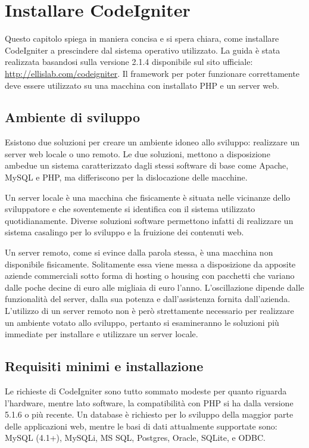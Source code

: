 \chapter{Installare CodeIgniter}
\label{cap:installazione}

Questo capitolo spiega in maniera concisa e si spera chiara, come installare CodeIgniter a prescindere dal sistema operativo utilizzato. La guida è stata realizzata basandosi sulla versione 2.1.4 disponibile sul sito ufficiale: \url{http://ellislab.com/codeigniter}. Il framework per poter funzionare correttamente deve essere utilizzato su una macchina con installato \ac{PHP} e un server web.

\section{Ambiente di sviluppo}
Esistono due soluzioni per creare un ambiente idoneo allo sviluppo: realizzare un server web locale o uno remoto. Le due soluzioni, mettono a disposizione ambedue un sistema caratterizzato dagli stessi software di base come Apache, MySQL e PHP, ma differiscono per la dislocazione delle macchine.

Un server locale è una macchina che fisicamente è situata nelle vicinanze dello sviluppatore e che soventemente si identifica con il sistema utilizzato quotidianamente. Diverse soluzioni software permettono infatti di realizzare un sistema casalingo per lo sviluppo e la fruizione dei contenuti web.

Un server remoto, come si evince dalla parola stessa, è una macchina non disponibile fisicamente. Solitamente essa viene messa a disposizione da apposite aziende commerciali sotto forma di hosting o housing con pacchetti che variano dalle poche decine di euro alle migliaia di euro l'anno. L'oscillazione dipende dalle funzionalità del server, dalla sua potenza e dall'assistenza fornita dall'azienda. L'utilizzo di un server remoto non è però strettamente necessario per realizzare un ambiente votato allo sviluppo, pertanto si esamineranno le soluzioni più immediate per installare e utilizzare un server locale.

\section{Requisiti minimi e installazione}
Le richieste di CodeIgniter sono tutto sommato modeste per quanto riguarda l'hardware, mentre lato software, la compatibilità con \ac{PHP} si ha dalla versione 5.1.6 o più recente. Un database è richiesto per lo sviluppo della maggior parte delle applicazioni web, mentre le basi di dati attualmente supportate sono: MySQL (4.1+), MySQLi, MS SQL, Postgres, Oracle, SQLite, e ODBC.

